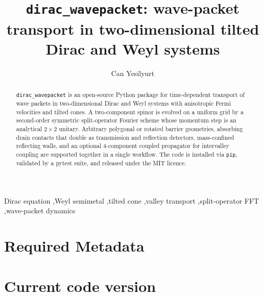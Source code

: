 \documentclass[preprint, 12pt, a4paper]{elsarticle}
\newcommand{\dirac}{\texttt{dirac\_wavepacket}\xspace}
\begin{document}
\renewcommand{\labelenumii}{\arabic{enumi}.\arabic{enumii}}

\begin{frontmatter}

\title{\texttt{dirac\_wavepacket}: wave-packet transport in two-dimensional tilted
       Dirac and Weyl systems}

\author[nrc]{Can Yesilyurt}


\address[nrc]{Nanoelectronics Research Center, Istanbul, Turkey}

\begin{abstract}
\dirac is an open-source Python package for time-dependent transport
of wave packets in two-dimensional Dirac and Weyl systems with
anisotropic Fermi velocities and tilted cones. A two-component spinor
is evolved on a uniform grid by a second-order symmetric
split-operator Fourier scheme whose momentum step is an analytical
$2\times2$ unitary. Arbitrary polygonal or rotated barrier
geometries, absorbing drain contacts that double as transmission and
reflection detectors, mass-confined reflecting walls, and an
optional $4$-component coupled propagator for intervalley coupling
are supported together in a single workflow. The code is installed
via \texttt{pip}, validated by a pytest suite, and released under
the MIT licence.
\end{abstract}

\begin{keyword}
Dirac equation \sep Weyl semimetal \sep tilted cone \sep valley
transport \sep split-operator FFT \sep wave-packet dynamics
\end{keyword}

\end{frontmatter}

\section*{Required Metadata}
\label{}

\section*{Current code version}
\label{}
\end{document}
